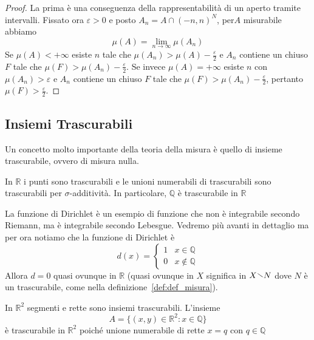 \begin{proof}
    La prima è una conseguenza della rappresentabilità di un aperto tramite
intervalli. Fissato ora \(\varepsilon>0\) e posto \(A_{n} = A \cap
{(-n,n)}^{N}\), per\(A\) misurabile abbiamo
\[
    \mu(A) = \lim_{n \to \infty} \mu(A_{n})
\]
Se \(\mu(A) < +\infty\) esiste \(n\) tale che \(\mu(A_{n}) > \mu(A) -
\frac{\varepsilon}{2}\) e \(A_{n}\) contiene un chiuso \(F\) tale che \(\mu(F) >
\mu(A_{n}) - \frac{\varepsilon}{2}\). Se invece \(\mu(A) = +\infty\) esiste
\(n\) con \(\mu(A_{n}) > \varepsilon\) e \(A_{n}\) contiene un chiuso \(F\) tale
che \(\mu(F) > \mu(A_{n}) - \frac{\varepsilon}{2}\), pertanto \(\mu(F) >
\frac{\varepsilon}{2}\).

\end{proof}

\subsection{Insiemi Trascurabili}
Un concetto molto importante della teoria della misura è quello di insieme
trascurabile, ovvero di misura nulla.
\begin{example}
    In \(\mathbb{R}\) i punti sono trascurabili e le unioni numerabili di
    trascurabili sono trascurabili per \(\sigma\)-additività.
    In particolare, \(\mathbb{Q}\) è trascurabile in \(\mathbb{R}\) 
\end{example}

La funzione di Dirichlet è un esempio di funzione che non è integrabile secondo
Riemann, ma è integrabile secondo Lebesgue. Vedremo più avanti in dettaglio ma
per ora notiamo che la funzione di Dirichlet è
\[
    d(x) = \begin{cases}
        1 & x \in \mathbb{Q}  \\
        0 & x \notin \mathbb{Q} 
    \end{cases}
\]
Allora \(d = 0\) quasi ovunque in \(\mathbb{R}\) (quasi ovunque in \(X\)
significa in \(X \sminus N\) dove \(N\) è un trascurabile, come nella
definizione~\ref{def:def_misura}).

\begin{example}
    In \(\mathbb{R}^2\) segmenti e rette sono insiemi trascurabili. L'insieme
    \[
        A = \{(x, y) \in \mathbb{R}^2 : x \in \mathbb{Q}\} 
    \]
    è trascurabile in \(\mathbb{R}^2\) poiché unione numerabile di rette \(x=q\)
    con \(q \in \mathbb{Q}\) 
\end{example}

